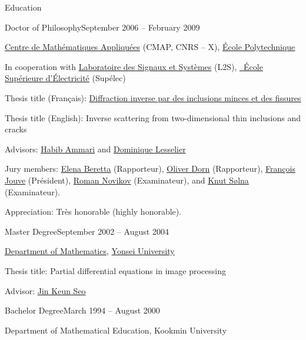 \documentclass{resume} %
\begin{document}
\begin{rSection}{Education}
\begin{rSubsection}{Doctor of Philosophy}{September 2006 -- February 2009}{}{}
\item \href{http://www.cmap.polytechnique.fr/}{Centre de Math\'ematiques Appliqu\'ees} (CMAP, CNRS -- X), \href{http://www.polytechnique.fr/}{\'Ecole Polytechnique}
\item In cooperation with \href{http://www.l2s.CentraleSup{\'e}lec.fr/}{Laboratoire des Signaux et Syst\`emes} (L2S), \href{http://www.CentraleSup{\'e}lec.fr/}{\
\'Ecole Sup\'erieure d'\'Electricit\'e} (Sup\'elec)
\item Thesis title (Fran\c{c}ais): \href{https://tel.archives-ouvertes.fr/pastel-00004834/}{Diffraction inverse par des inclusions minces et des fissures}
\item Thesis title (English): Inverse scattering from two-dimensional thin inclusions and cracks
\item Advisors: \href{https://people.math.ethz.ch/~hammari/}{Habib Ammari} and \href{http://webpages.lss.supelec.fr/perso/lesselier/}{Dominique Lesselier}
\item Jury members: \href{https://sites.google.com/view/eberetta/home}{Elena Beretta} (Rapporteur), \href{https://cpg.kfupm.edu.sa/bio/dr-oliver-dorn/}{Oliver Dorn} (Rapporteur), \href{http://www.cmapx.polytechnique.fr/~jouve}{Fran\c{c}ois Jouve} (Pr{\'e}sident), \href{http://www.cmapx.polytechnique.fr/~novikov/}{Roman Novikov} (Examinateur), and \href{https://www.math.uci.edu/~ksolna/}{Knut S\o lna} (Examinateur).
\item Appreciation: Tr\`es honorable (highly honorable).
\end{rSubsection}

\begin{rSubsection}{Master Degree}{September 2002 -- August 2004}{}{}
\item \href{http://math.yonsei.ac.kr/}{Department of Mathematics}, \href{http://www.yonsei.ac.kr/}{Yonsei University}
\item Thesis title: Partial differential equations in image processing
\item Advisor: \href{http://www.seojinkeun.com}{Jin Keun Seo}%
\end{rSubsection}

\begin{rSubsection}{Bachelor Degree}{March 1994 -- August 2000}{}{}
\item Department of Mathematical Education, Kookmin University
\end{rSubsection}
\end{rSection}
\end{document}

